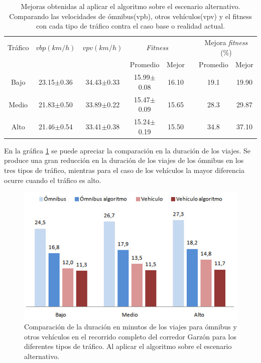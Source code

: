 \begin{table}[h]
	\renewcommand{\arraystretch}{1.2}
	\caption{Mejoras obtenidas al aplicar el algoritmo sobre el escenario alternativo. Comparando las velocidades de ómnibus(vpb), otros vehículos(vpv) y el fitness con cada tipo de tráfico contra el caso base o realidad actual.}
	\label{table:mejoras_trafico_alternativo_algoritmo}
	\centering
	\begin{tabular}{cccccccc}
		\hline 
		Tráfico& 
		$vbp(km/h)$& 
		$vpv(km/h)$&
		\multicolumn{2}{c}{\emph{Fitness}}&  & 
		\multicolumn{2}{c}{Mejora \emph{fitness} (\%)}\\  \cline{4-5} \cline{7-8}&     &     & \multicolumn{1}{c}{Promedio} & \multicolumn{1}{c}{Mejor} &  & \multicolumn{1}{c}{Promedio} & \multicolumn{1}{c}{Mejor} \\ \hline

		Bajo & 23.15$\pm$0.36 & 34.43$\pm$0.33 & 15.99$\pm$0.08 & 16.10 & & 19.1& 19.90 \\
		Medio & 21.83$\pm$0.50  & 33.89$\pm$0.22 & 15.47$\pm$0.09& 15.65 & & 28.3 & 29.87\\
		Alto & 21.46$\pm$0.54  & 33.41$\pm$0.38 & 15.24$\pm$0.19& 15.50 & & 34.8 & 37.10\\	
		\hline		    
	\end{tabular}
\end{table}

En la gráfica \ref{fig:duracion_viajes_alernativo} se puede apreciar la comparación en la duración de los viajes. Se produce una gran reducción en la duración de los viajes de los ómnibus en los tres tipos de tráfico, mientras para el caso de los vehículos la mayor diferencia ocurre cuando el tráfico es alto.

\begin{figure}[H]
	\centering
	\includegraphics[width=0.8\linewidth]{Figures/duracio_viajes_alternativo}
	\caption{Comparación de la duración en minutos de los viajes para ómnibus y otros vehículos en el recorrido completo del corredor Garzón para los diferentes tipos de tráfico. Al aplicar el algoritmo sobre el escenario alternativo.}
	\label{fig:duracion_viajes_alernativo}
\end{figure}

